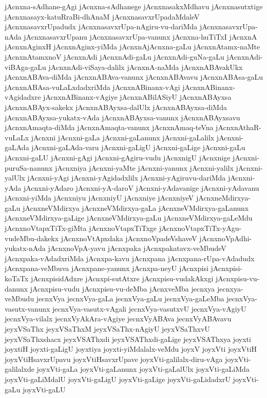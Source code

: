 {jAcnxna-sAdhane-gAgi
jAcnxna-sAdhanege
jAcnxnasakxMdhavu
jAcnxnasutxtige
jAcnxnasayx-katuRraBi-dhAnaM
jAcnxnasavxrUpadaMdaleV
jAcnxnasavxrUpadudx
jAcnxnasavxrUpa-nAgiru-vu-dariMda
jAcnxnasavxrUpa-nAda
jAcnxnasavxrUpanu
jAcnxnasavxrUpa-vanunx
jAcnxna-huTiTxI
jAcnxnA
jAcnxnAginxH
jAcnxnAginx-yiMda
jAcnxnAjAcnxna-gaLu
jAcnxnAtamx-naMte
jAcnxnAtamxnoV
jAcnxnAdi
jAcnxnAdi-gaLu
jAcnxnAdi-guNa-gaLu
jAcnxnAdi-viBAga-gaLu
jAcnxnAdi-viSaya-dalilx
jAcnxnA-naMda
jAcnxnABAvakUkx
jAcnxnABAva-diMda
jAcnxnABAva-vanunx
jAcnxnABAvavu
jAcnxnABAsa-gaLu
jAcnxnABAsa-vuLaLxdadxriMda
jAcnxnABinanx-vAgi
jAcnxnABinanx-vAgidadxre
jAcnxnABinanx-vAgiye
jAcnxnABilASiyU
jAcnxnABAyxsa
jAcnxnABAyx-sakekx
jAcnxnABAyxsa-dalUlx
jAcnxnABAyxsa-diMda
jAcnxnABAyxsa-yukatx-vAda
jAcnxnABAyxsa-vanunx
jAcnxnABAyxsavu
jAcnxnAmaqta-diMda
jAcnxnAmaqta-vanunx
jAcnxnAmaq-teVna
jAcnxnAthaR-vuLaLx
jAcnxni
jAcnxni-gaLa
jAcnxni-gaLanunx
jAcnxni-gaLalilx
jAcnxni-gaLAda
jAcnxni-gaLAda-varu
jAcnxni-gaLigU
jAcnxni-gaLige
jAcnxni-gaLu
jAcnxni-gaLU
jAcnxni-gAgi
jAcnxni-gAgiru-vudu
jAcnxnigU
jAcnxnige
jAcnxni-puruSa-nanunx
jAcnxniya
jAcnxni-yaMte
jAcnxni-yanunx
jAcnxni-yalilx
jAcnxni-yalUlx
jAcnxni-yAgi
jAcnxni-yAgidadxlilx
jAcnxni-yAgiruvu-dariMda
jAcnxni-yAda
jAcnxni-yAdaro
jAcnxni-yA-daroV
jAcnxni-yAdavanige
jAcnxni-yAdavanu
jAcnxni-yiMda
jAcnxniyu
jAcnxniyU
jAcnxniye
jAcnxniyeV
jAcnxneMdirxya-gaLu
jAcnxneVMdirxya
jAcnxneVMdirxya-gaLa
jAcnxneVMdirxya-gaLanunx
jAcnxneVMdirxya-gaLige
jAcnxneVMdirxya-gaLu
jAcnxneVMdirxya-gaLeMdu
jAcnxnoVtapxTiTx-giMta
jAcnxnoVtapxTiTxge
jAcnxnoVtapxTiTx-yAgu-vudeMbu-dakekx
jAcnxnoVtApxdaka
jAcnxnoVpadeVshaveV
jAcnxnoVpAdhi-yukatx-nAda
jAcnxnoVpA-yavu
jAcnxpaka
jAcnxpakatavx-veMbudeV
jAcnxpaka-vAdadxriMda
jAcnxpa-kavu
jAcnxpana
jAcnxpana-rUpa-vAdadudx
jAcnxpana-veMbuva
jAcnxpane-yanunx
jAcnxpa-neyU
jAcnxpisi
jAcnxpisi-koTaTx
jAcnxpisidAdxre
jAcnxpi-sutAtxre
jAcnxpisu-vudakAkxgi
jAcnxpisu-vu-danunx
jAcnxpisu-vudu
jAcnxpisu-vu-deMba
jAcnxveMba
jecnxya
jecnxya-veMbudu
jecnxVya
jecnxVya-gaLa
jecnxVya-gaLu
jecnxVya-gaLeMba
jecnxVya-vasutx-vanunx
jecnxVya-vasutx-vAgali
jecnxVya-vasutxvU
jecnxVya-vAgiyU
jecnxVya-vilalx
jecnxVyAkAra-vAgiye
jecnxVyABAva
jecnxVyABAvavu
jeyxVSaThx
jeyxVSaThxM
jeyxVSaThx-nAgiyU
jeyxVSaThxvU
jeyxVSaThxshacx
jeyxVSAThxdi
jeyxVSAThxdi-gaLige
jeyxVSAThxya
joyxti
joyxtiH
joyxti-gaLigU
joyxtiya
joyxti-yiMdalalx-veMdu
joyxV
joyxVti
joyxVtiH
joyxVtiHsavxrUpavu
joyxVtiHsavxrUpave
joyxVti-galilalx-diru-vAga
joyxVti-galilalxde
joyxVti-gaLa
joyxVti-gaLanunx
joyxVti-gaLalUlx
joyxVti-gaLiMda
joyxVti-gaLiMdalU
joyxVti-gaLigU
joyxVti-gaLige
joyxVti-gaLidadxrU
joyxVti-gaLu
joyxVti-gaLU
}
